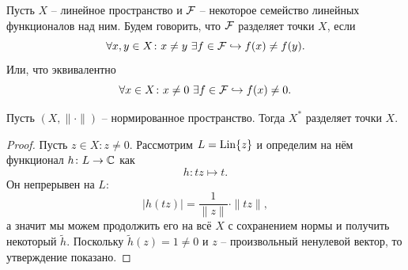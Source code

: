 \begin{definition}
    Пусть $X$ -- линейное пространство и $\mathcal{F}$ -- некоторое семейство линейных функционалов над ним.
    Будем говорить, что $\mathcal{F}$ разделяет точки $X$, если
    \[
        \forall x, y \in X \colon x \neq y \ \exists f \in \FF\hookrightarrow f(x) \neq f(y).
    \]
    Или, что эквивалентно
    \[
        \forall x \in X \colon x \neq 0 \ \exists f \in \mathcal{F}\hookrightarrow f(x) \neq 0.
    \]
\end{definition}
\begin{proposition}
    Пусть $(X, \|\cdot\|)$ -- нормированное пространство.
    Тогда $X^*$ разделяет точки $X$.
\end{proposition}
\begin{proof}
    Пусть $z \in X\colon z \neq 0$.
    Рассмотрим $L = \operatorname{Lin}\{z\}$ и определим на нём функционал $h\colon L \to \mathbb{C}$ как
    \[
        h\colon tz \mapsto t.
    \]
    Он непрерывен на $L$:
    \[
        |h(tz)| = \frac{1}{\|z\|} \cdot \|tz\|,
    \]
    а значит мы можем продолжить его на всё $X$ с сохранением нормы и получить некоторый $\tilde{h}$.
    Поскольку $\tilde{h}(z) = 1 \neq 0$ и $z$ -- произвольный ненулевой вектор, то утверждение показано.
\end{proof}
